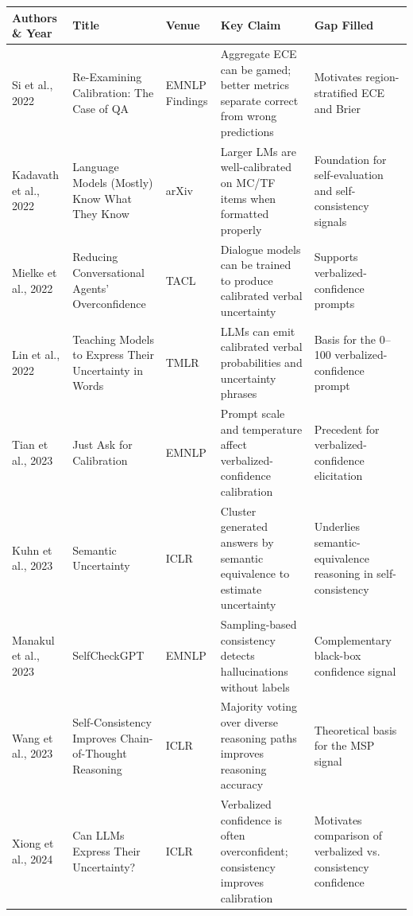 \documentclass[11pt]{article}
\begin{document}
\begin{table}[t]
\centering
\small
\setlength{\tabcolsep}{3pt}
\renewcommand{\arraystretch}{1.15}
\begin{tabular}{@{}p{2.0cm}p{3.9cm}p{1.4cm}p{4.0cm}p{3.6cm}@{}}
\toprule
\textbf{Authors \& Year} & \textbf{Title} & \textbf{Venue} & \textbf{Key Claim} & \textbf{Gap Filled} \\
\midrule
Si et al., 2022 \cite{si2022reexamining} & Re-Examining Calibration: The Case of QA & EMNLP Findings & Aggregate ECE can be gamed; better metrics separate correct from wrong predictions & Motivates region-stratified ECE and Brier \\
Kadavath et al., 2022 \cite{kadavath2022language} & Language Models (Mostly) Know What They Know & arXiv & Larger LMs are well-calibrated on MC/TF items when formatted properly & Foundation for self-evaluation and self-consistency signals \\
Mielke et al., 2022 \cite{mielke2022reducing} & Reducing Conversational Agents' Overconfidence & TACL & Dialogue models can be trained to produce calibrated verbal uncertainty & Supports verbalized-confidence prompts \\
Lin et al., 2022 \cite{lin2022teaching} & Teaching Models to Express Their Uncertainty in Words & TMLR & LLMs can emit calibrated verbal probabilities and uncertainty phrases & Basis for the 0--100 verbalized-confidence prompt \\
Tian et al., 2023 \cite{tian2023just} & Just Ask for Calibration & EMNLP & Prompt scale and temperature affect verbalized-confidence calibration & Precedent for verbalized-confidence elicitation \\
Kuhn et al., 2023 \cite{kuhn2023semantic} & Semantic Uncertainty & ICLR & Cluster generated answers by semantic equivalence to estimate uncertainty & Underlies semantic-equivalence reasoning in self-consistency \\
Manakul et al., 2023 \cite{manakul2023selfcheckgpt} & SelfCheckGPT & EMNLP & Sampling-based consistency detects hallucinations without labels & Complementary black-box confidence signal \\
Wang et al., 2023 \cite{wang2023selfconsistency} & Self-Consistency Improves Chain-of-Thought Reasoning & ICLR & Majority voting over diverse reasoning paths improves reasoning accuracy & Theoretical basis for the MSP signal \\
Xiong et al., 2024 \cite{xiong2024can} & Can LLMs Express Their Uncertainty? & ICLR & Verbalized confidence is often overconfident; consistency improves calibration & Motivates comparison of verbalized vs. consistency confidence \\

\end{tabular}
\end{table}
\end{document}
